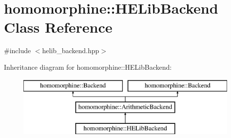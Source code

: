\hypertarget{classhomomorphine_1_1_h_e_lib_backend}{}\section{homomorphine\+::H\+E\+Lib\+Backend Class Reference}
\label{classhomomorphine_1_1_h_e_lib_backend}


{\ttfamily \#include $<$helib\+\_\+backend.\+hpp$>$}

Inheritance diagram for homomorphine\+::H\+E\+Lib\+Backend\+:\begin{figure}[H]
\begin{center}
\leavevmode
\includegraphics[height=3.000000cm]{classhomomorphine_1_1_h_e_lib_backend}
\end{center}
\end{figure}
